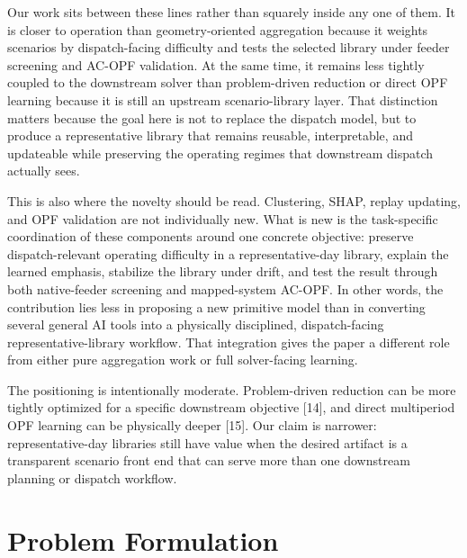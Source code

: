 \documentclass[journal]{IEEEtran}
\begin{document}
Our work sits between these lines rather than squarely inside any one of them. It is closer to operation than geometry-oriented aggregation because it weights scenarios by dispatch-facing difficulty and tests the selected library under feeder screening and AC-OPF validation. At the same time, it remains less tightly coupled to the downstream solver than problem-driven reduction or direct OPF learning because it is still an upstream scenario-library layer. That distinction matters because the goal here is not to replace the dispatch model, but to produce a representative library that remains reusable, interpretable, and updateable while preserving the operating regimes that downstream dispatch actually sees.

This is also where the novelty should be read. Clustering, SHAP, replay updating, and OPF validation are not individually new. What is new is the task-specific coordination of these components around one concrete objective: preserve dispatch-relevant operating difficulty in a representative-day library, explain the learned emphasis, stabilize the library under drift, and test the result through both native-feeder screening and mapped-system AC-OPF. In other words, the contribution lies less in proposing a new primitive model than in converting several general AI tools into a physically disciplined, dispatch-facing representative-library workflow. That integration gives the paper a different role from either pure aggregation work or full solver-facing learning.

The positioning is intentionally moderate. Problem-driven reduction can be more tightly optimized for a specific downstream objective [14], and direct multiperiod OPF learning can be physically deeper [15]. Our claim is narrower: representative-day libraries still have value when the desired artifact is a transparent scenario front end that can serve more than one downstream planning or dispatch workflow.

\section{Problem Formulation}
\end{document}

